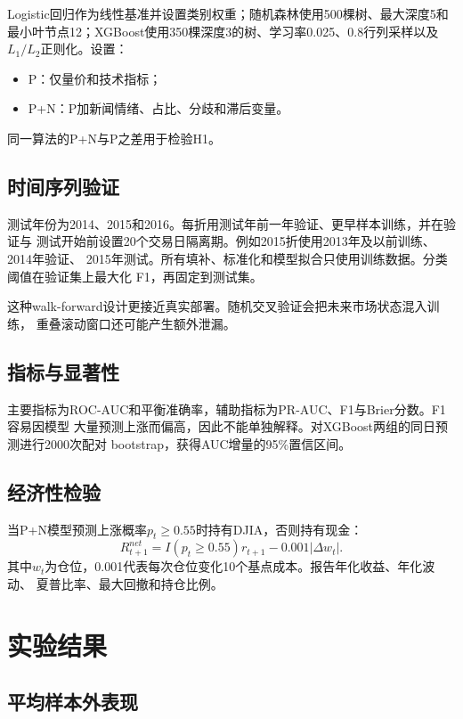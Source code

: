 \documentclass[UTF8,a4paper,9pt,twocolumn,fontset=none]{ctexart}
\begin{document}
Logistic回归作为线性基准并设置类别权重；随机森林使用500棵树、最大深度5和
最小叶节点12；XGBoost使用350棵深度3的树、学习率0.025、0.8行列采样以及
$L_1/L_2$正则化\cite{xgboost}。设置：
\begin{itemize}
  \item P：仅量价和技术指标；
  \item P+N：P加新闻情绪、占比、分歧和滞后变量。
\end{itemize}
同一算法的P+N与P之差用于检验H1。

\subsection{时间序列验证}

测试年份为2014、2015和2016。每折用测试年前一年验证、更早样本训练，并在验证与
测试开始前设置20个交易日隔离期。例如2015折使用2013年及以前训练、2014年验证、
2015年测试。所有填补、标准化和模型拟合只使用训练数据。分类阈值在验证集上最大化
F1，再固定到测试集。

这种walk-forward设计更接近真实部署。随机交叉验证会把未来市场状态混入训练，
重叠滚动窗口还可能产生额外泄漏\cite{lop}。

\subsection{指标与显著性}

主要指标为ROC-AUC和平衡准确率，辅助指标为PR-AUC、F1与Brier分数。F1容易因模型
大量预测上涨而偏高，因此不能单独解释。对XGBoost两组的同日预测进行2000次配对
bootstrap，获得AUC增量的95\%置信区间。

\subsection{经济性检验}

当P+N模型预测上涨概率$p_t\geq0.55$时持有DJIA，否则持有现金：
\begin{equation}
R_{t+1}^{net}=I(p_t\geq0.55)r_{t+1}-0.001|\Delta w_t|.
\end{equation}
其中$w_t$为仓位，0.001代表每次仓位变化10个基点成本。报告年化收益、年化波动、
夏普比率、最大回撤和持仓比例。

\section{实验结果}

\subsection{平均样本外表现}
\end{document}
